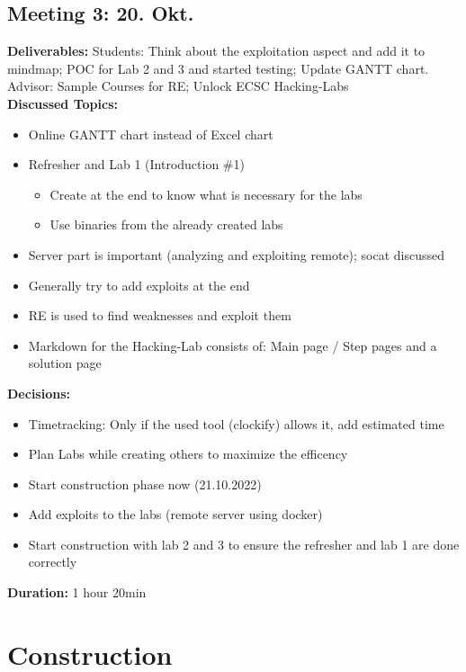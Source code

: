 \subsection*{Meeting 3: 20. Okt.}
\textbf{Deliverables:} Students: Think about the exploitation aspect and add it to mind\-map; POC for Lab 2 and 3 and started testing; Update GANTT chart. \\ 
Advisor: Sample Courses for RE; Unlock ECSC Hacking-Labs \\
\textbf{Discussed Topics:} 
\begin{itemize}
    \item Online GANTT chart instead of Excel chart
    \item Refresher and Lab 1 (Introduction \#1)
    \begin{itemize}
        \item Create at the end to know what is necessary for the labs
        \item Use binaries from the already created labs
    \end{itemize}
    \item Server part is important (analyzing and exploiting remote); socat discussed
    \item Generally try to add exploits at the end
    \item RE is used to find weaknesses and exploit them
    \item Markdown for the Hacking-Lab consists of: Main page / Step pages and a solution page
\end{itemize}
\textbf{Decisions:}
\begin{itemize}
    \item Timetracking: Only if the used tool (clockify) allows it, add estimated time
    \item Plan Labs while creating others to maximize the efficency
    \item Start construction phase now (21.10.2022)
    \item Add exploits to the labs (remote server using docker)
    \item Start construction with lab 2 and 3 to ensure the refresher and lab 1 are done correctly
\end{itemize}
\textbf{Duration:} 1 hour 20min

\section{Construction}

